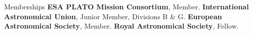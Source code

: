 \begin{rubric}{Memberships}
\entry*[2024 -- ~~~~~\,\,\,~~~]
    \textbf{ESA PLATO Mission Consortium}, Member.
\entry*[2023 -- ~~~~~\,\,\,~~~]
    \textbf{International Astronomical Union}, Junior Member, Divisions B \& G.
\entry*[2021 -- ~~~~~\,\,\,~~~]
    \textbf{European Astronomical Society}, Member.
\entry*[2016 -- ~~~~~\,\,\,~~~]
    \textbf{Royal Astronomical Society}, Fellow.

\end{rubric}